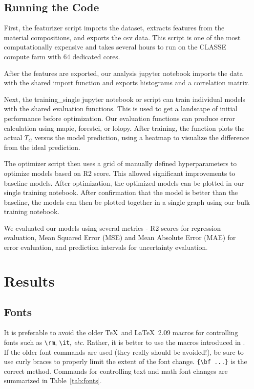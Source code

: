 \documentclass[twocolumn, nofootinbib, secnumarabic, amssymb, nobibnotes, aps, prd]{revtex4-2}
\newcommand{\macro}[1]{\texttt{\textbackslash#1}}
\newcommand{\m}[1]{\macro{#1}}
\begin{document}
\subsection{Running the Code}

First, the featurizer script imports the dataset, extracts features from the material compositions, and exports the csv data. This script is one of the most computationally expensive and takes several hours to run on the CLASSE compute farm with 64 dedicated cores.

After the features are exported, our analysis jupyter notebook imports the data with the shared import function and exports histograms and a correlation matrix. 

Next, the training\_single jupyter notebook or script can train individual models with the shared evaluation functions. This is used to get a landscape of initial performance before optimization. Our evaluation functions can produce error calculation using mapie, forestci, or lolopy. After training, the function plots the actual $T_C$ versus the model prediction, using a heatmap to visualize the difference from the ideal prediction.

The optimizer script then uses a grid of manually defined hyperparameters to optimize models based on R2 score. This allowed significant improvements to baseline models. After optimization, the optimized models can be plotted in our single training notebook. After confirmation that the model is better than the baseline, the models can then be plotted together in a single graph using our bulk training notebook. 

We evaluated our models using several metrics - R2 scores for regression evaluation, Mean Squared Error (MSE) and Mean Absolute Error (MAE) for error evaluation, and prediction intervals for uncertainty evaluation.



\section{Results}

\subsection{Fonts}
It is preferable to avoid the older \TeX\ and \LaTeX\ 2.09 macros for
controlling fonts such as \m{rm}, \m{it}, \textit{etc.} Rather, it is
better to use the macros introduced in \LaTeXe.  If the older font
commands are used (they really should be avoided!), be sure to use
curly braces to properly limit the extent of the font
change. \verb+{\bf ...}+ is the correct method.
Commands for controlling text and math font changes are summarized in
Table~\ref{tab:fonts}.





\end{document}
